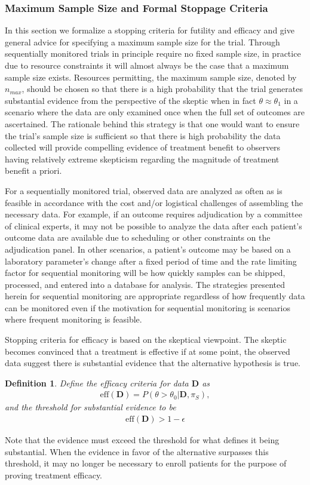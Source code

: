 \documentclass[12pt]{article}
\newtheorem{mydef}{Definition}
\begin{document}
\subsubsection{Maximum Sample Size and Formal Stoppage Criteria}
In this section we formalize a stopping criteria for futility and efficacy and give general 
advice for specifying a maximum sample size for the trial.
%
Through sequentially monitored trials in principle require no fixed sample size, in practice due to resource 
constraints it will almost always be the case that a maximum sample size exists. 
%
Resources permitting, the maximum sample size, denoted by $n_{max}$, should be chosen so that there is a 
high probability that the trial generates substantial evidence from the perspective of the skeptic when in 
fact $\theta \approx \theta_1$ in a scenario where the data are only examined once when the full set of 
outcomes are ascertained.
%
The rationale behind this strategy is that one would want to ensure the trial's sample size is sufficient so that
there is high probability the data collected will provide compelling evidence of treatment benefit to observers 
having relatively extreme skepticism regarding the magnitude of treatment benefit a priori.  


For a sequentially monitored trial, observed data are analyzed as often as is feasible in accordance with 
the cost and/or logistical challenges of assembling the necessary data.
%
For example, if an outcome requires adjudication by a committee of clinical experts, it may not be possible to analyze the
data after each patient's outcome data are available due to scheduling or other constraints on the adjudication panel.
%
In other scenarios, a patient's outcome may be based on a laboratory parameter's change after a fixed period of time
and the rate limiting factor for sequential monitoring will be how quickly samples can be shipped, processed, and entered
into a database for analysis.  
%
The strategies presented herein for sequential monitoring are appropriate regardless of how frequently data can be monitored
even if the motivation for sequential monitoring is scenarios where frequent monitoring is feasible.

Stopping criteria for efficacy is based on the skeptical viewpoint. The skeptic becomes convinced that a treatment is effective if at some point, the observed data suggest there is 
substantial evidence that the alternative hypothesis is true. 

\begin{mydef}
Define the efficacy criteria for data $\mathbf{D}$ as 
\begin{align}
\text{eff}(\mathbf{D})=P(\theta>\theta_0|\mathbf{D},\pi_S),
\end{align}
%
and the threshold for substantial evidence to be 
\begin{align}
\text{eff}(\mathbf{D})>1-\epsilon
\end{align}
\end{mydef}
%
Note that the evidence must exceed the threshold for what defines it being substantial.
%
When the evidence in favor of the alternative surpasses this threshold, it may no longer be necessary to enroll patients
for the purpose of proving treatment efficacy.
\end{document}
